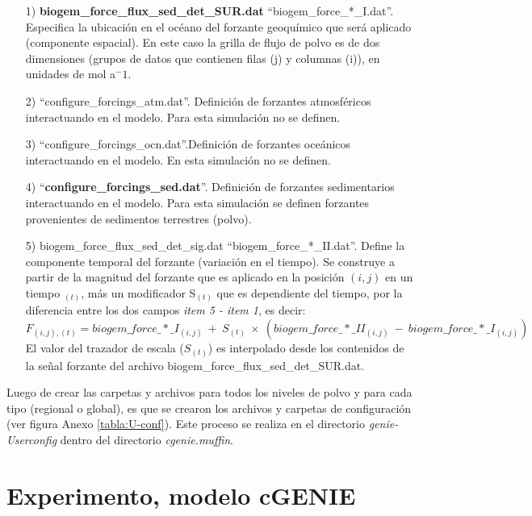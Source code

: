 \begin{itemize}
  \item[1) ] \textbf{biogem\_force\_flux\_sed\_det\_SUR.dat} ``biogem\_force\_*\_I.dat''. Especifica la ubicación en el océano del forzante geoquímico que será aplicado (componente espacial). En este caso la grilla de flujo de polvo es de dos dimensiones (grupos de datos que contienen filas (j) y columnas (i)), en unidades de mol a$^-1$. 
  \item[2) ] ``configure\_forcings\_atm.dat''. Definición de forzantes atmosféricos interactuando en el modelo. Para esta simulación no se definen. 
  \item[3) ] ``configure\_forcings\_ocn.dat''.Definición de forzantes oceánicos interactuando en el modelo. En esta simulación no se definen. 
  \item[4) ] ``\textbf{configure\_forcings\_sed.dat}''. Definición de forzantes sedimentarios interactuando en el modelo. Para esta simulación se definen forzantes provenientes de sedimentos terrestres (polvo). 
  \item[5) ] biogem\_force\_flux\_sed\_det\_sig.dat ``biogem\_force\_*\_II.dat''. Define la componente temporal del forzante (variación en el tiempo). 
Se construye a partir de la magnitud del forzante que es aplicado en la posición $(i,j)$ en un tiempo $_{(t)}$, m\'as un modificador S$_{(t)}$ que es dependiente del tiempo, por la diferencia entre los dos campos \textit{item 5 - item 1}, es decir: 
 \begin{equation} \label{eq:met1}
F_{(i,j),(t)}= biogem\_force\_*\_I_{(i,j)}\ +\ S_{(t)}\ \times\ (biogem\_force\_*\_II_{(i,j)}\ -\ biogem\_force\_*\_I_{(i,j)})
\end{equation}
El valor del trazador de escala ($S_{(t)}$) es interpolado desde los contenidos de la se\~nal forzante del archivo 
biogem\_force\_flux\_sed\_det\_SUR.dat.
\end{itemize}

Luego de crear las carpetas y archivos para todos los niveles de polvo y para cada tipo (regional o global), es que se crearon los archivos y carpetas de configuraci\'on (ver figura Anexo \ref{tabla:U-conf}). Este proceso se realiza en el directorio \textit{genie-Userconfig} dentro del directorio \textit{cgenie.muffin}. \newpage

\section{Experimento, modelo cGENIE}

